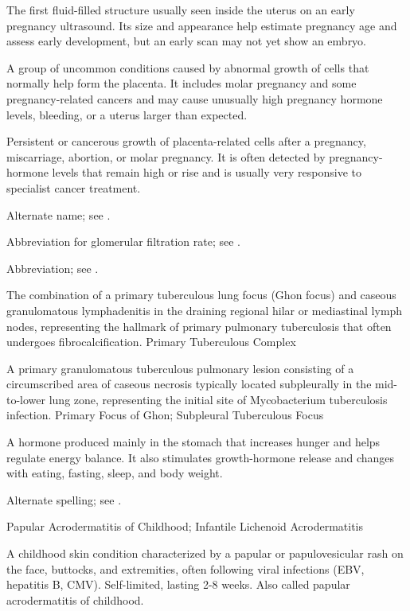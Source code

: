  The first fluid-filled structure usually seen inside the uterus on an early pregnancy ultrasound. Its size and appearance help estimate pregnancy age and assess early development, but an early scan may not yet show an embryo.

 A group of uncommon conditions caused by abnormal growth of cells that normally help form the placenta. It includes molar pregnancy and some pregnancy-related cancers and may cause unusually high pregnancy hormone levels, bleeding, or a uterus larger than expected.

 Persistent or cancerous growth of placenta-related cells after a pregnancy, miscarriage, abortion, or molar pregnancy. It is often detected by pregnancy-hormone levels that remain high or rise and is usually very responsive to specialist cancer treatment.

 Alternate name; see .

 Abbreviation for glomerular filtration rate; see .

 Abbreviation; see .

 The combination of a primary tuberculous lung focus (Ghon focus) and caseous granulomatous lymphadenitis in the draining regional hilar or mediastinal lymph nodes, representing the hallmark of primary pulmonary tuberculosis that often undergoes fibrocalcification.
\synonyms
Primary Tuberculous Complex

 A primary granulomatous tuberculous pulmonary lesion consisting of a circumscribed area of caseous necrosis typically located subpleurally in the mid-to-lower lung zone, representing the initial site of Mycobacterium tuberculosis infection.
\synonyms
Primary Focus of Ghon; Subpleural Tuberculous Focus

 A hormone produced mainly in the stomach that increases hunger and helps regulate energy balance. It also stimulates growth-hormone release and changes with eating, fasting, sleep, and body weight.

 Alternate spelling; see .

\synonyms
Papular Acrodermatitis of Childhood; Infantile Lichenoid Acrodermatitis

 A childhood skin condition characterized by a papular or papulovesicular rash on the face, buttocks, and extremities, often following viral infections (EBV, hepatitis B, CMV). Self-limited, lasting 2-8 weeks. Also called papular acrodermatitis of childhood.

